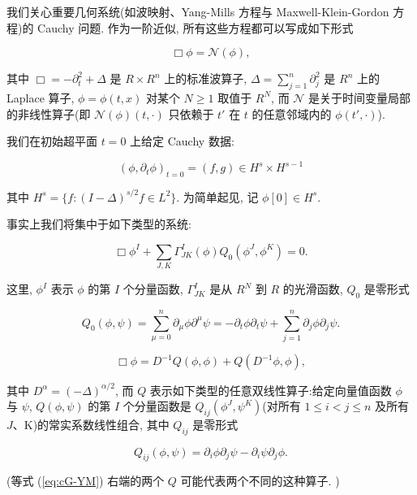 我们关心重要几何系统(如波映射、Yang-Mills 方程与 Maxwell-Klein-Gordon 方程)的 Cauchy 问题. 作为一阶近似, 所有这些方程都可以写成如下形式

\[
\Box \phi = \mathcal {N} (\phi), 
\]

其中 $\Box = -\partial_{t}^{2} + \Delta$ 是 $R \times R^{n}$ 上的标准波算子, $\Delta = \sum_{j=1}^{n} \partial_{j}^{2}$ 是 $R^{n}$ 上的 Laplace 算子, $\phi = \phi(t,  x)$ 对某个 $N \geq 1$ 取值于 $R^{N}$, 而 $\mathcal{N}$ 是关于时间变量局部的非线性算子(即 $\mathcal{N}(\phi)(t,  \cdot)$ 只依赖于 $t'$ 在 $t$ 的任意邻域内的 $\phi(t',  \cdot)$). 

我们在初始超平面 $t = 0$ 上给定 Cauchy 数据:

\[
(\phi ,  \partial_ {t} \phi) _ {t = 0} = (f,  g) \in H ^ {s} \times H ^ {s - 1}
\]

其中 $H^{s} = \{f : (I - \Delta)^{s / 2}f\in L^{2}\}$. 为简单起见, 记 $\phi [0]\in H^s$. 

事实上我们将集中于如下类型的系统:


\begin{equation}
\Box \phi^ {I} + \sum_ {J,  K} \Gamma_ {J K} ^ {I} (\phi) Q _ {0} (\phi^ {J},  \phi^ {K}) = 0.\tag{WM}\label{eq:cG-WM}
\end{equation}

这里, $\phi^{I}$ 表示 $\phi$ 的第 $I$ 个分量函数, $\Gamma_{JK}^{I}$ 是从 $R^{N}$ 到 $R$ 的光滑函数, $Q_{0}$ 是零形式

\[
Q _ {0} (\phi ,  \psi) = \sum_ {\mu = 0} ^ {n} \partial_ {\mu} \phi \partial^ {\mu} \psi = - \partial_ {t} \phi \partial_ {t} \psi + \sum_ {j = 1} ^ {n} \partial_ {j} \phi \partial_ {j} \psi .
\]


\begin{equation}
\Box \phi = D ^ {- 1} Q (\phi ,  \phi) + Q (D ^ {- 1} \phi ,  \phi), \tag{YM}\label{eq:cG-YM}
\end{equation}

其中 $D^{\alpha}=(-\Delta)^{\alpha/2}$, 而 $Q$ 表示如下类型的任意双线性算子:给定向量值函数 $\phi$ 与 $\psi$, $Q(\phi, \psi)$ 的第 $I$ 个分量函数是 $Q_{ij}(\phi^{J}, \psi^{K})$(对所有 $1\leq i<j\leq n$ 及所有 $J$、K)的常实系数线性组合, 其中 $Q_{ij}$ 是零形式

\[
Q _ {i j} (\phi ,  \psi) = \partial_ {i} \phi \partial_ {j} \psi - \partial_ {i} \psi \partial_ {j} \phi .
\]

(等式 (\ref{eq:cG-YM}) 右端的两个 $Q$ 可能代表两个不同的这种算子. )

